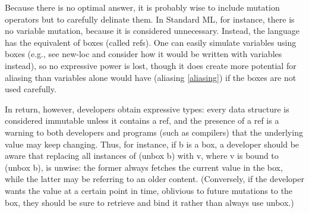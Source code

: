 Because there is no optimal answer, it is probably wise to include mutation
operators but to carefully delinate them. In Standard ML, for instance, there is
no variable mutation, because it is considered unnecessary. Instead, the
language has the equivalent of boxes (called refs). One can easily simulate
variables using boxes (e.g., see new-loc and consider how it would be written
with variables instead), so no expressive power is lost, though it does create
more potential for aliasing than variables alone would have (aliasing
\ref{aliasing}) if the boxes are not used carefully.

In return, however, developers obtain expressive types: every data structure is
considered immutable unless it contains a ref, and the presence of a ref is a
warning to both developers and programs (such as compilers) that the underlying
value may keep changing. Thus, for instance, if b is a box, a developer should
be aware that replacing all instances of (unbox b) with v, where v is bound to
(unbox b), is unwise: the former always fetches the current value in the box,
while the latter may be referring to an older content. (Conversely, if the
developer wants the value at a certain point in time, oblivious to future
mutations to the box, they should be sure to retrieve and bind it rather than
always use unbox.)
